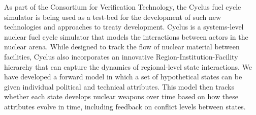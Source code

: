 As part of the Consortium for Verification Technology, the Cyclus fuel cycle simulator is being used as a test-bed for the development of such new technologies and approaches to treaty development. Cyclus is a systems-level nuclear fuel cycle simulator that models the interactions between actors in the nuclear arena. While designed to track the flow of nuclear material between facilities, Cyclus also incorporates an innovative Region-Institution-Facility hierarchy that can capture the dynamics of regional-level state interactions.  We have developed a forward model in which a set of hypothetical states can be given individual political and technical attributes. This model then tracks whether each state develops nuclear weapons over time based on how these attributes evolve in time, including feedback on conflict levels between states.

